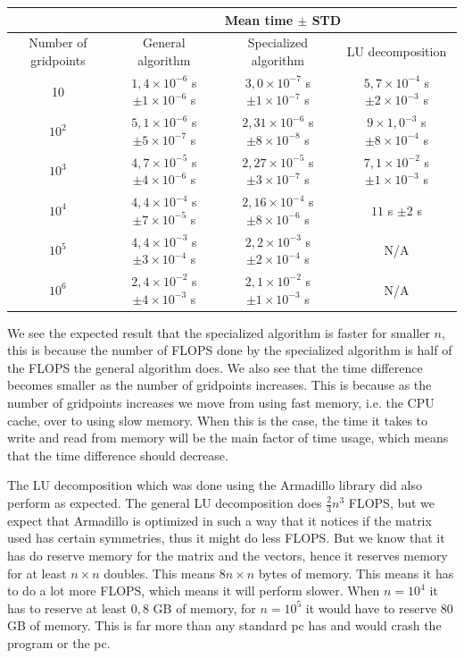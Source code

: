 \documentclass[10pt]{article}
\begin{document}
\begin{tabular}{||c|c|c|c||}
  \hline\hline 
    & \multicolumn{3}{|c||}{Mean time $\pm$ STD}\\
  \hline
  Number of gridpoints & General algorithm  & Specialized algorithm & LU decomposition \\
  \hline
  10 & $1,4\times 10^{-6}$ s $\pm 1\times 10^{-6}$ s& 
  $3,0\times 10^{-7}$ s $\pm 1 \times 10^{-7}$ s &  
  $5,7\times 10^{-4}$ s $\pm 2 \times 10^{-3}$ s \\
  \hline
  $10^2$ & $5,1\times 10^{-6}$ s $\pm 5 \times 10^{-7}$ s &
  $2,31\times 10^{-6}$ s $\pm 8 \times 10^{-8}$ s &
  $9\times 1,0^{-3}$ s $\pm 8 \times 10^{-4}$ s \\
  \hline
  $10^3$ & $4,7 \times 10^{-5}$ s $\pm 4 \times 10^{-6}$ s &
  $2,27\times 10^{-5}$ s $\pm 3 \times 10^{-7}$ s &
  $7,1\times 10^{-2}$ s $\pm 1\times 10^{-3}$ s \\
  \hline
  $10^4$ & $4,4 \times 10^{-4}$ s $\pm 7 \times 10^{-5}$ s &
  $2,16\times 10^{-4}$ s $\pm 8 \times 10^{-6}$ s &
  $11$ s $\pm 2$ s \\
  \hline 
  $10^5$ & $4,4 \times 10^{-3}$ s $\pm 3 \times 10^{-4}$ s&
  $2,2\times 10^{-3}$ s $\pm 2 \times 10^{-4}$ s & N/A\\
  \hline
  $10^6$ &$2,4 \times 10^{-2}$ s $\pm 4 \times 10^{-3}$ s &
  $2,1\times 10^{-2}$ s $\pm 1 \times 10^{-3}$ s & N/A \\
  \hline\hline  
\end{tabular}

\hfill\break

We see the expected result that the specialized algorithm is faster for smaller $n$, this is because the number of FLOPS done by the specialized algorithm is half of the FLOPS the general algorithm does. We also see that the time difference becomes smaller as the number of gridpoints increases. This is because as the number of gridpoints increases we move from using fast memory, i.e. the CPU cache, over to using slow memory. When this is the case, the time it takes to write and read from memory will be the main factor of time usage, which means that the time difference should decrease.
\hfill\break

The LU decomposition which was done using the Armadillo library did also perform as expected. The general LU decomposition does $\frac{2}{3}n^3$ FLOPS, but we expect that Armadillo is optimized in such a way that it notices if the matrix used has certain symmetries, thus it might do less FLOPS. But we know that it has do reserve memory for the matrix and the vectors, hence it reserves memory for at least $n\times n$ doubles. This means $8 n\times n$ bytes of memory. This means it has to do a lot more FLOPS, which means it will perform slower. When $n=10^4$ it has to reserve at least $0,8$ GB of memory, for $n=10^5$ it would have to reserve 80 GB of memory. This is far more than any standard pc has and would crash the program or the pc.
\end{document}
